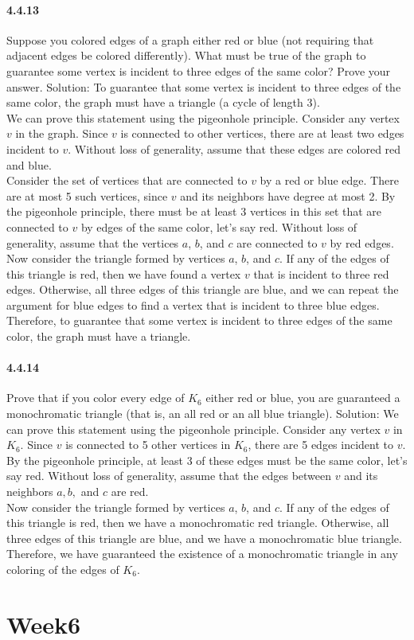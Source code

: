 \documentclass{article}
\begin{document}
\paragraph{4.4.13}
Suppose you colored edges of a graph either red or blue (not requiring
that adjacent edges be colored differently). What must be true of the
graph to guarantee some vertex is incident to three edges of the same
color? Prove your answer.\newline
Solution:\newline
To guarantee that some vertex is incident to three edges of the same color, the graph must have a triangle (a cycle of length 3).
\\
We can prove this statement using the pigeonhole principle. Consider any vertex $v$ in the graph. Since $v$ is connected to other vertices, there are at least two edges incident to $v$. Without loss of generality, assume that these edges are colored red and blue.
\\
Consider the set of vertices that are connected to $v$ by a red or blue edge. There are at most 5 such vertices, since $v$ and its neighbors have degree at most 2. By the pigeonhole principle, there must be at least 3 vertices in this set that are connected to $v$ by edges of the same color, let's say red. Without loss of generality, assume that the vertices $a$, $b$, and $c$ are connected to $v$ by red edges.
\\
Now consider the triangle formed by vertices $a$, $b$, and $c$. If any of the edges of this triangle is red, then we have found a vertex $v$ that is incident to three red edges. Otherwise, all three edges of this triangle are blue, and we can repeat the argument for blue edges to find a vertex that is incident to three blue edges.
\\
Therefore, to guarantee that some vertex is incident to three edges of the same color, the graph must have a triangle.
\paragraph{4.4.14}
Prove that if you color every edge of $K_6$ either red or blue, you are guaranteed a monochromatic triangle (that is, an all red or an all blue triangle).\newline
Solution:\newline
We can prove this statement using the pigeonhole principle. Consider any vertex $v$ in $K_6$. Since $v$ is connected to 5 other vertices in $K_6$, there are 5 edges incident to $v$. By the pigeonhole principle, at least 3 of these edges must be the same color, let's say red. Without loss of generality, assume that the edges between $v$ and its neighbors $a,b,$ and $c$ are red.
\\
Now consider the triangle formed by vertices $a$, $b$, and $c$. If any of the edges of this triangle is red, then we have a monochromatic red triangle. Otherwise, all three edges of this triangle are blue, and we have a monochromatic blue triangle. Therefore, we have guaranteed the existence of a monochromatic triangle in any coloring of the edges of $K_6$.
\newpage \section{Week6}
\end{document}
